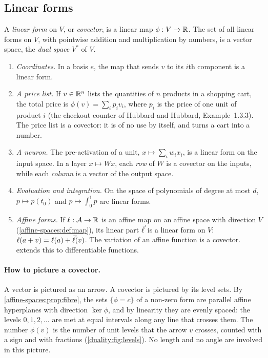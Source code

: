 \begin{notechapter}
\section{Linear forms}\label{duality:sec:forms}

\begin{definition}\label{duality:def:dual}
A \emph{linear form} on $V$, or \emph{covector}, is a linear map
$\phi:V\to\mathbb{R}$. The set of all linear forms on $V$, with pointwise addition
and multiplication by numbers, is a vector space, the \emph{dual space}
$V^*$ of $V$.
\end{definition}

\begin{example}\label{duality:ex:forms}
\begin{enumerate}[nosep]
  \item \emph{Coordinates.} In a basis $e$, the map that sends $v$ to its
        $i$th component is a linear form.
  \item \emph{A price list.} If $v\in\mathbb{R}^n$ lists the quantities of $n$
        products in a shopping cart, the total price is $\phi(v) =
        \sum_ip_iv_i$, where $p_i$ is the price of one unit of product $i$
        (the checkout counter of Hubbard and Hubbard, Example~1.3.3). The
        price list is a covector: it is of no use by itself, and turns a
        cart into a number.
  \item \emph{A neuron.} The pre-activation of a unit, $x\mapsto
        \sum_iw_ix_i$, is a linear form on the input space. In a layer
        $x\mapsto Wx$, each \emph{row} of $W$ is a covector on the
        inputs, while each \emph{column} is a vector of the output space.
  \item \emph{Evaluation and integration.} On the space of polynomials of
        degree at most $d$, $p\mapsto p(t_0)$ and $p\mapsto\int_0^1p$ are
        linear forms.
  \item \emph{Affine forms.} If $\ell:\mathcal{A}\to\mathbb{R}$ is an affine map on an
        affine space with direction $V$
        (\cref{affine-spaces:def:map}), its linear part $\vec{\ell}$ is a
        linear form on $V$: $\ell(a + v) = \ell(a) + \vec{\ell}(v)$. The
        variation of an affine function is a covector. 
        extends this to differentiable functions.
\end{enumerate}
\end{example}

\paragraph{How to picture a covector.} A vector is pictured as an arrow.
A covector is pictured by its level sets. By
\cref{affine-spaces:prop:fibre}, the sets $\{\phi = c\}$ of a non-zero
form are parallel affine hyperplanes with direction $\ker\phi$, and by
linearity they are evenly spaced: the levels $0, 1, 2,\dots$ are met at
equal intervals along any line that crosses them. The number $\phi(v)$ is
the number of unit levels that the arrow $v$ crosses, counted with a sign
and with fractions (\cref{duality:fig:levels}). No length and no angle are
involved in this picture.


\end{notechapter}
